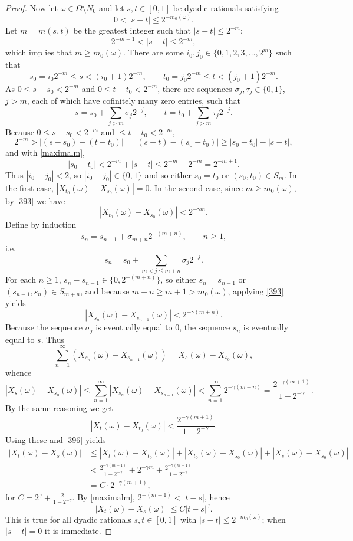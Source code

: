\documentclass{article}
\theoremstyle{definition}
\begin{document}
\begin{proof}
Now let $\omega \in \Omega \setminus N_0$ and let $s,t \in [0,1]$ be dyadic rationals satisfying
\[
0<|s-t| \leq 2^{-m_0(\omega)}.
\]
Let $m=m(s,t)$ be the greatest integer  such that $|s-t| \leq 2^{-m}$:  
\begin{equation}
2^{-m-1} < |s-t| \leq 2^{-m},
\label{maximalm}
\end{equation}
which implies that $m \geq m_0(\omega)$.
There are some $i_0, j_0 \in \{0,1,2,3,\ldots,2^m\}$ such that 
\[
s_0 = i_0 2^{-m} \leq s < (i_0+1)2^{-m}, \qquad t_0= j_0 2^{-m} \leq t < (j_0+1)2^{-m}.
\]
As $0 \leq s-s_0 < 2^{-m}$ and $0 \leq t-t_0 < 2^{-m}$, there are 
sequences $\sigma_j, \tau_j \in \{0,1\}$, $j>m$, each of which have cofinitely many zero entries, such that
\[
s=s_0+\sum_{j > m} \sigma_j 2^{-j}, \qquad t=t_0+ \sum_{j > m} \tau_j 2^{-j}.
\]
Because $0\leq s-s_0<2^{-m}$ and $\leq t-t_0<2^{-m}$,
\[
2^{-m} > |(s-s_0)-(t-t_0)|
=|(s-t)-(s_0-t_0)|
\geq |s_0-t_0|-|s-t|,
\]
and with \eqref{maximalm},
\[
|s_0-t_0| < 2^{-m}+|s-t| \leq 2^{-m}+2^{-m} =2^{-m+1}.
\] 
Thus $|i_0-j_0| < 2$, so
$|i_0-j_0| \in \{0,1\}$ and so either
$s_0=t_0$ or $(s_0,t_0) \in S_m$. 
In the first case, $|X_{t_0}(\omega)-X_{s_0}(\omega)|=0$.
 In the second case, since $m \geq m_0(\omega)$,
by \eqref{393} we have
\begin{equation}
|X_{t_0}(\omega)-X_{s_0}(\omega)| < 2^{-\gamma m} .
\label{396}
\end{equation}
Define by induction
\[
s_n = s_{n-1}+\sigma_{m+n}2^{-(m+n)}, \qquad n \geq 1,
\]
i.e.
\[
s_n = s_0 + \sum_{m<j \leq m+n} \sigma_j 2^{-j}.
\]
For each $n \geq 1$,  $s_n-s_{n-1} \in \{0,2^{-(m+n)}\}$, so either
$s_n=s_{n-1}$ or $(s_{n-1},s_n) \in S_{m+n}$, and because
 $m+n \geq m+1>m_0(\omega)$, applying \eqref{393} yields
\[
|X_{s_n}(\omega)-X_{s_{n-1}}(\omega)| < 2^{-\gamma(m+n)}.
\]
Because the sequence $\sigma_j$ is eventually equal to $0$, the sequence $s_n$ is eventually equal to $s$.  Thus
\[
\sum_{n=1}^\infty (X_{s_n}(\omega)-X_{s_{n-1}}(\omega))
=X_s(\omega)-X_{s_0}(\omega),
\]
whence
\[
|X_s(\omega)-X_{s_0}(\omega)| \leq \sum_{n=1}^\infty |X_{s_n}(\omega)-X_{s_{n-1}}(\omega)|
<\sum_{n=1}^\infty 2^{-\gamma(m+n)}
=\frac{2^{-\gamma (m+1)}}{1-2^{-\gamma}}.
\]
By the same reasoning we get 
\[
|X_t(\omega)-X_{t_0}(\omega)| < \frac{2^{-\gamma (m+1)}}{1-2^{-\gamma}}.
\]
Using these and \eqref{396} yields
\begin{align*}
|X_t(\omega)-X_s(\omega)|&\leq |X_t(\omega)-X_{t_0}(\omega)|
+|X_{t_0}(\omega)-X_{s_0}(\omega)|+|X_s(\omega)-X_{s_0}(\omega)|\\
&<\frac{2^{-\gamma (m+1)}}{1-2^{-\gamma}}+2^{-\gamma m}+\frac{2^{-\gamma (m+1)}}{1-2^{-\gamma}}\\
&=C\cdot 2^{-\gamma(m+1)},
\end{align*}
for $C=2^\gamma+\frac{2}{1-2^{-\gamma}}$. 
By \eqref{maximalm}, $2^{-(m+1)}<|t-s|$,
hence
\begin{equation}
|X_t(\omega)-X_s(\omega)| \leq C |t-s|^\gamma.
\label{398}
\end{equation}
This is true for all dyadic rationals $s,t \in [0,1]$ with $|s-t| \leq 2^{-m_0(\omega)}$; when $|s-t|=0$ it is immediate.


\end{proof}
\end{document}
